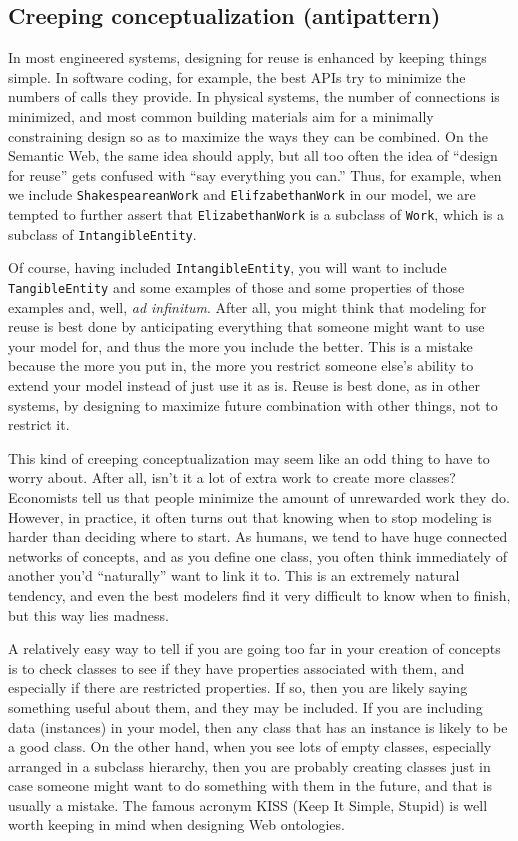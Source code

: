 \subsection{Creeping conceptualization (antipattern)}

In most engineered systems, designing for reuse is enhanced by keeping
things simple. In software coding, for example, the best APIs try to
minimize the numbers of calls they provide. In physical systems, the
number of connections is minimized, and most common building materials
aim for a minimally constraining design so as to maximize the ways they
can be combined. On the Semantic Web, the same idea should apply, but
all too often the idea of ``design for reuse'' gets confused with ``say
everything you can.'' Thus, for example, when we include
\texttt{ShakespeareanWork} and \texttt{ElifzabethanWork} in our model, we are tempted to
further assert that \texttt{ElizabethanWork} is a subclass of \texttt{Work}, which is a
subclass of \texttt{IntangibleEntity}.

Of course, having included \texttt{IntangibleEntity}, you will want to include
\texttt{TangibleEntity} 
and some examples of those and some properties of those examples and,
well, \emph{ad infinitum}. After all, you might think that modeling for reuse
is best done by anticipating everything that someone might want to use
your model for, and thus the more you include the better. This is a
mistake because the more you put in, the more you restrict someone
else's ability to extend your model instead of just use it
as is. Reuse is best done, as in other systems, by designing to maximize
future combination with other things, not to restrict it.

This kind of creeping conceptualization may seem like an odd thing to
have to worry about. After all, isn't it a lot of extra work to create
more classes? Economists tell us that people minimize the amount of
unrewarded work they do. However, in practice, it often turns out that
knowing when to stop modeling is harder than deciding where to start. As
humans, we tend to have huge connected networks of concepts, and as you
define one class, you often think immediately of another you'd
``naturally'' want to link it to. This is an extremely natural tendency,
and even the best modelers find it very difficult to know when to
finish, but this way lies madness.

A relatively easy way to tell if you are going too far in your creation
of concepts is to check classes to see if they have properties
associated with them, and especially if there are restricted properties.
If so, then you are likely saying something useful about them, and they
may be included. If you are including data (instances) in your model,
then any class that has an instance is likely to be a good class. On the
other hand, when you see lots of empty classes, especially arranged in a
subclass hierarchy, then you are probably creating classes just in case
someone might want to do something with them in the future, and that is
usually a mistake. The famous acronym KISS (Keep It Simple, Stupid) is
well worth keeping in mind when designing Web ontologies.

